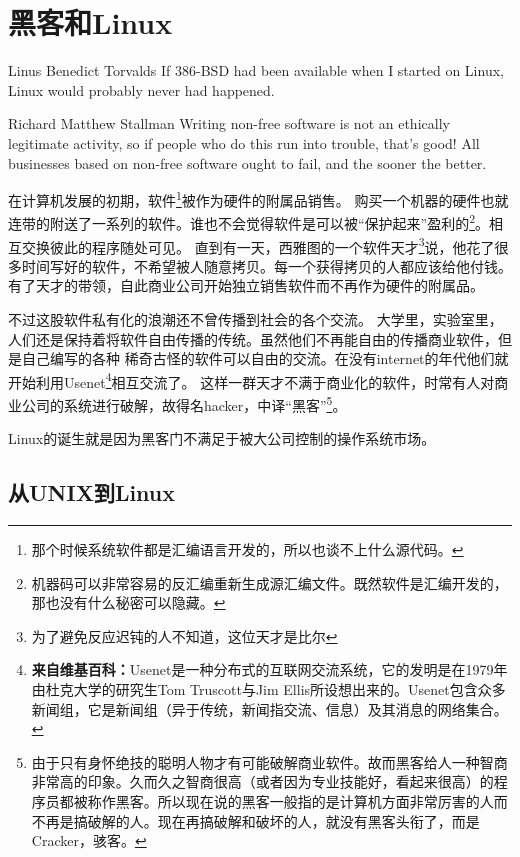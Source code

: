 \chapter{黑客和Linux}

\begin{quotes}{Linus Benedict Torvalds}
If 386-BSD had been available when I started on Linux, Linux would probably never had happened.
\end{quotes}

\begin{quotes}{Richard Matthew Stallman}
Writing non-free software is not an ethically legitimate activity, so if people who do this run into trouble, that's good! All businesses based on non-free software ought to fail, and the sooner the better.
\end{quotes}

在计算机发展的初期，软件\footnote{那个时候系统软件都是汇编语言开发的，所以也谈不上什么源代码。}被作为硬件的附属品销售。
购买一个机器的硬件也就连带的附送了一系列的软件。谁也不会觉得软件是可以被“保护起来”盈利的\footnote{机器码可以非常容易的反汇编重新生成源汇编文件。既然软件是汇编开发的，那也没有什么秘密可以隐藏。}。相互交换彼此的程序随处可见。
直到有一天，西雅图的一个软件天才\footnote{为了避免反应迟钝的人不知道，这位天才是比尔}说，他花了很多时间写好的软件，不希望被人随意拷贝。每一个获得拷贝的人都应该给他付钱。
有了天才的带领，自此商业公司开始独立销售软件而不再作为硬件的附属品。

不过这股软件私有化的浪潮还不曾传播到社会的各个交流。
大学里，实验室里，人们还是保持着将软件自由传播的传统。虽然他们不再能自由的传播商业软件，但是自己编写的各种
稀奇古怪的软件可以自由的交流。在没有internet的年代他们就开始利用Usenet\footnote{%
\textbf{来自维基百科：}Usenet是一种分布式的互联网交流系统，它的发明是在1979年由杜克大学的研究生Tom Truscott与Jim Ellis所设想出来的。Usenet包含众多新闻组，它是新闻组（异于传统，新闻指交流、信息）及其消息的网络集合。 }相互交流了。
%
这样一群天才不满于商业化的软件，时常有人对商业公司的系统进行破解，故得名hacker，中译“黑客”\footnote{%
由于只有身怀绝技的聪明人物才有可能破解商业软件。故而黑客给人一种智商非常高的印象。久而久之智商很高（或者因为专业技能好，看起来很高）的程序员都被称作黑客。所以现在说的黑客一般指的是计算机方面非常厉害的人而不再是搞破解的人。现在再搞破解和破坏的人，就没有黑客头衔了，而是Cracker，骇客。
}。

Linux的诞生就是因为黑客门不满足于被大公司控制的操作系统市场。

\section{从UNIX到Linux}

